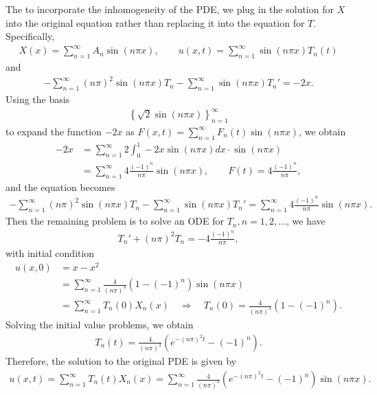 \documentclass[12pt, a4paper]{article}
\begin{document}
\begin{spacing}{1.1}
The to incorporate the inhomogeneity of the PDE, we plug in the solution for $X$ into the original equation rather than replacing it into the equation for $T$. Specifically,
\begin{align*}
X(x) = \sum_{n=1}^{\infty} A_n\sin(n\pi x), \qquad u(x, t) = \sum_{n=1}^{\infty} \sin(n\pi x)T_n(t)
\end{align*}
and
\begin{align*}
-\sum_{n=1}^{\infty}(n\pi)^2 \sin(n\pi x)T_n - \sum_{n=1}^{\infty}\sin(n\pi x)T_n' = -2x.
\end{align*}
Using the basis
\begin{align*}
\left\{\sqrt{2}\sin(n\pi x) \right\}_{n=1}^{\infty}
\end{align*}
to expand the function $-2x$ as $\displaystyle F(x, t) = \sum_{n=1}^{\infty}F_n(t)\sin(n\pi x)$, we obtain
\begin{align*}
-2x & = \sum_{n=1}^{\infty} 2\int_{0}^{1} -2x\sin(n\pi x)dx \cdot \sin(n\pi x) \\
& = \sum_{n=1}^{\infty} 4\frac{(-1)^n}{n\pi} \sin(n\pi x), \qquad F(t) = 4\frac{(-1)^n}{n\pi},
\end{align*}
and the equation becomes
\begin{align*}
-\sum_{n=1}^{\infty}(n\pi)^2\sin(n\pi x) T_n - \sum_{n=1}^{\infty}\sin(n\pi x)T_n' = \sum_{n=1}^{\infty} 4\frac{(-1)^n}{n\pi} \sin(n\pi x).
\end{align*}
Then the remaining problem is to solve an ODE for $T_n, n = 1, 2, \ldots$, we have
\begin{align*}
T_n' + (n\pi)^2T_n = -4\frac{(-1)^n}{n\pi},
\end{align*}
with initial condition
\begin{align*}
u(x, 0) & = x - x^2 \\
& = \sum_{n=1}^{\infty} \frac{4}{(n\pi)^3}(1 - (-1)^n)\sin(n\pi x) \\
& = \sum_{n=1}^{\infty}T_n(0)X_n(x)\quad\Rightarrow\quad T_n(0) = \frac{4}{(n\pi)^3}(1 - (-1)^n).
\end{align*}
Solving the initial value problems, we obtain
\begin{align*}
T_n(t) = \frac{4}{(n\pi)^3}\left(e^{-(n\pi)^2t} - (-1)^n\right).
\end{align*}
Therefore, the solution to the original PDE is given by
\begin{align*}
u(x, t) = \sum_{n=1}^{\infty} T_n(t)X_n(x) = \sum_{n=1}^{\infty}\frac{4}{(n\pi)^3}\left(e^{-(n\pi)^2t} - (-1)^n\right)\sin(n\pi x).
\end{align*}



\end{spacing}
\end{document}
